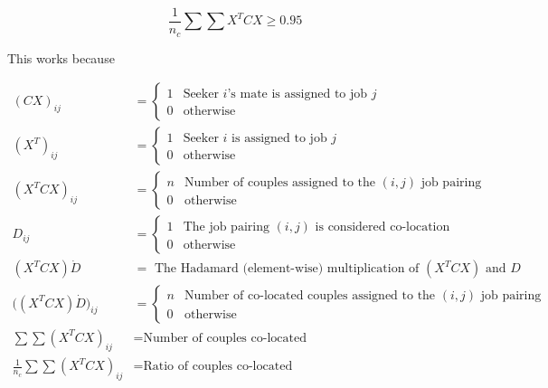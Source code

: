 \[\frac{1}{n_c} \sum \sum X^TCX \geq 0.95\]

 This works because

 \begin{align*}
(CX)_{ij} &= \begin{cases}
1 & \text{Seeker $i$'s mate is assigned to job $j$} \\
0& \text{otherwise}
\end{cases} \\
(X^T)_{ij} &= \begin{cases}
1 & \text{Seeker $i$ is assigned to job $j$} \\
0 & \text{otherwise}
\end{cases}\\
(X^TCX)_{ij} &= \begin{cases}
n & \text{Number of couples assigned to the $(i,j)$ job pairing} \\
0 & \text{otherwise}
\end{cases}\\
D_{ij} &= \begin{cases}
1 & \text{The job pairing $(i,j)$ is considered co-location } \\
0 & \text{otherwise}
\end{cases}\\
(X^TCX) \dot D &= \text{ The Hadamard (element-wise) multiplication of $(X^TCX)$ and $D$} \\
\big((X^TCX) \dot D \big)_{ij} &= \begin{cases}
n & \text{Number of co-located couples assigned to the $(i,j)$ job pairing} \\
0 & \text{otherwise}
\end{cases}\\
\sum \sum (X^TCX)_{ij} &= \text{Number of couples co-located} \\
\frac{1}{n_c} \sum \sum (X^TCX)_{ij} &= \text{Ratio of couples co-located}
 \end{align*}